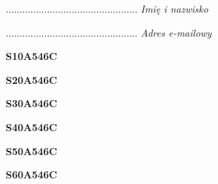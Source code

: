 \begin{turn}{90}\begin{minipage}{\linewidth} \vspace{20mm} ................................................  \textit{Imię i nazwisko}\end{minipage}\end{turn}

\begin{turn}{90}\begin{minipage}{\linewidth} \vspace{20mm} ................................................  \textit{Adres e-mailowy}\end{minipage}\end{turn}

\begin{turn}{90}\huge \begin{minipage}{\linewidth} \vspace{10mm}\textbf{S10A546C}\end{minipage}\end{turn}

\begin{turn}{90}\huge \begin{minipage}{\linewidth} \vspace{10mm}\textbf{S20A546C}\end{minipage}\end{turn}

\begin{turn}{90}\huge \begin{minipage}{\linewidth} \vspace{10mm}\textbf{S30A546C}\end{minipage}\end{turn}

\begin{turn}{90}\huge \begin{minipage}{\linewidth} \vspace{10mm}\textbf{S40A546C}\end{minipage}\end{turn}

\begin{turn}{90}\huge \begin{minipage}{\linewidth} \vspace{10mm}\textbf{S50A546C}\end{minipage}\end{turn}

\begin{turn}{90}\huge \begin{minipage}{\linewidth} \vspace{10mm}\textbf{S60A546C}\end{minipage}\end{turn}

